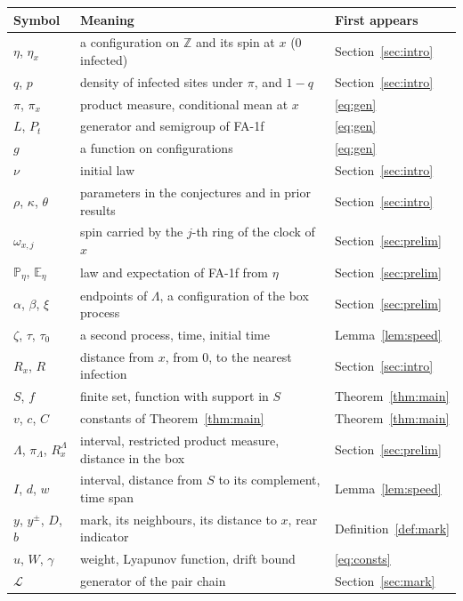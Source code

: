 \documentclass[11pt]{amsart}
\theoremstyle{definition}
\theoremstyle{remark}
\newcommand{\PP}{\mathbb{P}}
\newcommand{\E}{\mathbb{E}}
\newcommand{\Z}{\mathbb{Z}}
\newcommand{\cL}{\mathcal{L}}
\begin{document}
\begin{center}
\small
\begin{tabular}{p{3.4cm}p{7.4cm}p{3.2cm}}
\toprule
Symbol & Meaning & First appears\\
\midrule
$\eta$, $\eta_x$ & a configuration on $\Z$ and its spin at $x$ ($0$ infected) & Section~\ref{sec:intro}\\
$q$, $p$ & density of infected sites under $\pi$, and $1-q$ & Section~\ref{sec:intro}\\
$\pi$, $\pi_x$ & product measure, conditional mean at $x$ & \eqref{eq:gen}\\
$L$, $P_t$ & generator and semigroup of FA-1f & \eqref{eq:gen}\\
$g$ & a function on configurations & \eqref{eq:gen}\\
$\nu$ & initial law & Section~\ref{sec:intro}\\
$\rho$, $\kappa$, $\theta$ & parameters in the conjectures and in prior results & Section~\ref{sec:intro}\\
$\omega_{x,j}$ & spin carried by the $j$-th ring of the clock of $x$ & Section~\ref{sec:prelim}\\
$\PP_\eta$, $\E_\eta$ & law and expectation of FA-1f from $\eta$ & Section~\ref{sec:prelim}\\
$\alpha$, $\beta$, $\xi$ & endpoints of $\Lambda$, a configuration of the box process & Section~\ref{sec:prelim}\\
$\zeta$, $\tau$, $\tau_0$ & a second process, time, initial time & Lemma~\ref{lem:speed}\\
$R_x$, $R$ & distance from $x$, from $0$, to the nearest infection & Section~\ref{sec:intro}\\
$S$, $f$ & finite set, function with support in $S$ & Theorem~\ref{thm:main}\\
$v$, $c$, $C$ & constants of Theorem~\ref{thm:main} & Theorem~\ref{thm:main}\\
$\Lambda$, $\pi_\Lambda$, $R^\Lambda_x$ & interval, restricted product measure, distance in the box & Section~\ref{sec:prelim}\\
$I$, $d$, $w$ & interval, distance from $S$ to its complement, time span & Lemma~\ref{lem:speed}\\
$y$, $y^\pm$, $D$, $b$ & mark, its neighbours, its distance to $x$, rear indicator & Definition~\ref{def:mark}\\
$u$, $W$, $\gamma$ & weight, Lyapunov function, drift bound & \eqref{eq:consts}\\
$\cL$ & generator of the pair chain & Section~\ref{sec:mark}\\

\end{tabular}
\end{center}
\end{document}
